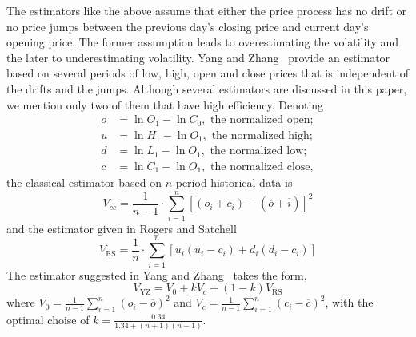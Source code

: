 The estimators like the above assume that either the price process has no drift or no price jumps between the previous day's closing price and current day's opening price. The former assumption leads to overestimating the volatility and the later to underestimating volatility. Yang and Zhang~\cite{yangzhang2000} provide an estimator based on several periods of low, high, open and close prices that is independent of the drifts and the jumps. Although several estimators are discussed in this paper, we mention only two of them that have high efficiency. Denoting
	\[
	\begin{split}
	o&= \ln O_1 - \ln C_0, \text{ the normalized open}; \\
	u&= \ln H_1 - \ln O_1, \text{ the normalized high}; \\
	d&= \ln L_1 - \ln O_1, \text{ the normalized low}; \\
	c&= \ln C_1 - \ln O_1,  \text{ the normalized close},
	\end{split}
	\]
the classical estimator based on $n$-period historical data is
	\begin{equation}\label{eqn:nperioddata}
	V_{cc}= \dfrac{1}{n-1} \cdot \sum_{i=1}^n [(o_i + c_i) - (\overline{o} + \overline{i})]^2
	\end{equation}
and the estimator given in Rogers and Satchell~\cite{rogerssatchell1991}
	\begin{equation}\label{eqn:rogerssatchell}
	V_{\text{RS}}= \dfrac{1}{n} \cdot \sum_{i=1}^n [u_i(u_i - c_i) + d_i(d_i-c_i)]
	\end{equation}
The estimator suggested in Yang and Zhang~\cite{yangzhang2000} takes the form,
	\begin{equation}\label{eqn:yang2000}
	V_{\text{YZ}}= V_0 + k V_c + (1-k)V_{\text{RS}}
	\end{equation}
where $V_0= \frac{1}{n-1} \sum_{i=1}^n (o_i-\overline{o})^2$ and $V_c=\frac{1}{n-1} \sum_{i=1}^n (c_i - \overline{c})^2$, with the optimal choise of $k=\frac{0.34}{1.34 + (n+1)(n-1)}$. \\


